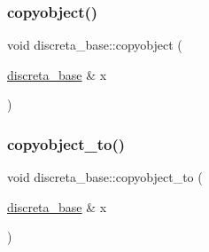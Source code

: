 \mbox{\label{classdiscreta__base_a68fac2b12cefae0bc4d1a41faf9bc862}} 
\subsubsection{\texorpdfstring{copyobject()}{copyobject()}}
{\footnotesize\ttfamily void discreta\+\_\+base\+::copyobject (\begin{DoxyParamCaption}\item[{\mbox{\hyperlink{classdiscreta__base}{discreta\+\_\+base}} \&}]{x }\end{DoxyParamCaption})}

\mbox{\label{classdiscreta__base_a33180628d9ced231267229b3564790f3}} 
\subsubsection{\texorpdfstring{copyobject\+\_\+to()}{copyobject\_to()}}
{\footnotesize\ttfamily void discreta\+\_\+base\+::copyobject\+\_\+to (\begin{DoxyParamCaption}\item[{\mbox{\hyperlink{classdiscreta__base}{discreta\+\_\+base}} \&}]{x }\end{DoxyParamCaption})\hspace{0.3cm}{\ttfamily [virtual]}}



